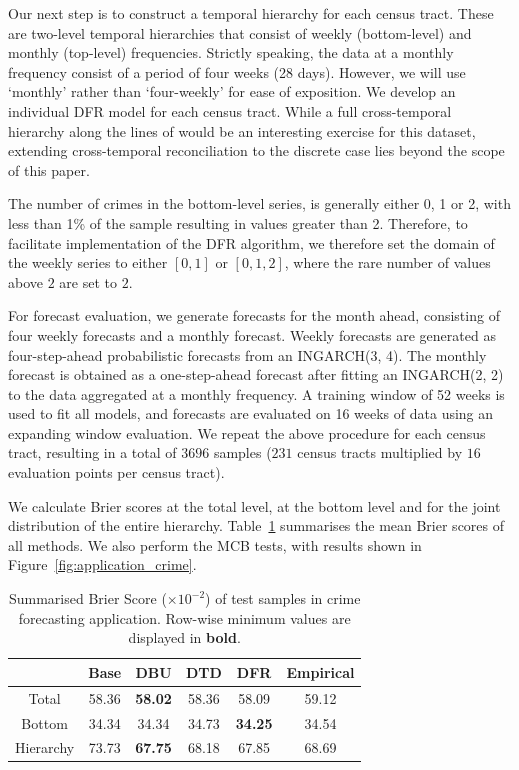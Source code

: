 \documentclass[a4paper,review,12pt,authoryear]{elsarticle}
\theoremstyle{definition}
\begin{document}
     
     Our next step is to construct a temporal hierarchy for each census tract. These are two-level temporal hierarchies that consist of weekly (bottom-level) and monthly (top-level) frequencies. Strictly speaking, the data at a monthly frequency consist of a period of four weeks (28 days). However, we will use `monthly' rather than `four-weekly' for ease of exposition. We develop an individual DFR model for each census tract. While a full cross-temporal hierarchy along the lines of \cite{kourentzesCrosstemporalCoherentForecasts2019} would be an interesting exercise for this dataset, extending cross-temporal reconciliation to the discrete case lies beyond the scope of this paper.
     
     The number of crimes in the bottom-level series, is generally either 0, 1 or 2, with less than 1\% of the sample resulting in values greater than 2. Therefore, to facilitate implementation of the DFR algorithm, we therefore set the domain of the weekly series to either $[0, 1]$ or $[0, 1, 2]$, where the rare number of values above $2$ are set to $2$.

     For forecast evaluation, we generate forecasts for the month ahead, consisting of four weekly forecasts and a monthly forecast. Weekly forecasts are generated as four-step-ahead probabilistic forecasts from an INGARCH(3, 4). The monthly forecast is obtained as a one-step-ahead forecast after fitting an INGARCH(2, 2) to the data aggregated at a monthly frequency.
     A training window of 52 weeks is used to fit all models, and forecasts are evaluated on 16 weeks of data using an expanding window evaluation. We repeat the above procedure for each census tract, resulting in a total of $3696$ samples ($231$ census tracts multiplied by $16$ evaluation points per census tract).
     
     We calculate Brier scores at the total level, at the bottom level and for the joint distribution of the entire hierarchy.
     Table~\ref{tab:crime_bs} summarises the mean Brier scores of all methods. We also perform the MCB tests, with results shown in Figure~\ref{fig:application_crime}.

     \begin{table}[h]
       \centering
       \caption{\label{tab:crime_bs}Summarised Brier Score ($\times 10^{-2}$) of test samples in crime forecasting application. Row-wise minimum values are displayed in \textbf{bold}.}
       \begin{tabular}{cccccc}
       \toprule
       ~ & Base & DBU & DTD & DFR & Empirical \\\midrule 
       Total & 58.36 & \textbf{58.02} & 58.36 & 58.09 & 59.12 \\ 
       Bottom & 34.34 & 34.34 & 34.73 & \textbf{34.25} & 34.54 \\ 
       Hierarchy & 73.73 & \textbf{67.75} & 68.18 & {67.85} & 68.69 \\ 
       \bottomrule
       \end{tabular}
       \end{table}
\end{document}
